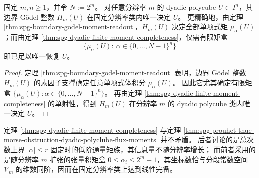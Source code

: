 \begin{corollary}\label{cor:spg-boundary-godel-finite-moment-completeness}
固定 \(m,n\ge 1\)，并令 \(N:=2^m\)。
对任意分辨率 \(m\) 的 dyadic polycube \(U\subset I^n\)，其边界 Gödel 整数 \(H_m(U)\) 在固定分辨率类内唯一决定 \(U\)。
更精确地，由定理 \ref{thm:spg-boundary-godel-moment-readout}，\(H_m(U)\) 决定全部单项式矩 \(\mu_{\alpha}(U)\)；而由定理 \ref{thm:spg-dyadic-finite-moment-completeness}，仅需有限矩盒
\[
\bigl\{\mu_{\alpha}(U):\ \alpha\in\{0,\dots,N-1\}^{n}\bigr\}
\]
即已足以唯一恢复 \(U\)。
\end{corollary}
\begin{proof}
定理 \ref{thm:spg-boundary-godel-moment-readout} 表明，边界 Gödel 整数 \(H_m(U)\) 的素因子支撑确定任意单项式体积分 \(\mu_{\alpha}(U)\)。
因此它尤其确定有限矩盒
\(
\{\mu_{\alpha}(U):\alpha\in\{0,\dots,N-1\}^{n}\}
\)。
再由定理 \ref{thm:spg-dyadic-finite-moment-completeness} 的单射性，得到 \(H_m(U)\) 在分辨率 \(m\) 的 dyadic polycube 类内唯一决定 \(U\)。
\end{proof}

\begin{remark}[与低阶通量矩障碍的相容性]\label{rem:spg-dyadic-finite-moment-completeness-vs-obstruction}
定理 \ref{thm:spg-dyadic-finite-moment-completeness} 与定理 \ref{thm:spg-prouhet-thue-morse-obstruction-dyadic-polyclube-flux-moments} 并不矛盾。
后者讨论的是总次数上界 \(|\alpha|\le r\) 固定时的低阶通量矩族，其信息量不随分辨率增长；
而前者采用的是随分辨率 \(m\) 扩张的张量积矩盒 \(0\le \alpha_i\le 2^m-1\)，其坐标数恰与分段常数空间 \(\mathcal V_m\) 的维数同阶，因而在固定分辨率类上达到线性完备。
\end{remark}



\endinput
